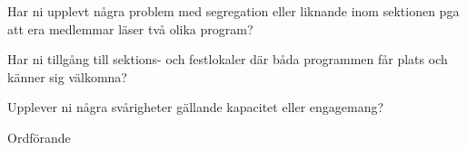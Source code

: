 \documentclass[10pt]{article}
\begin{document}
    \begin{dashlist}
        \item Har ni upplevt några problem med segregation eller liknande inom sektionen pga att era medlemmar läser två olika program?
        \item Har ni tillgång till sektions- och festlokaler där båda programmen får plats och känner sig välkomna?
        \item Upplever ni några svårigheter gällande kapacitet eller engagemang?
    \end{dashlist}

    \begin{signatures}{1}
    \textit{\ist}
    \signature{Edvard Carlsson}{Ordförande}
    \end{signatures}




   
    
\end{document}
